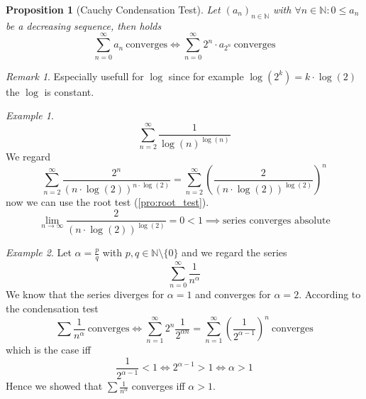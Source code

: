 \documentclass[english,titlepage]{uzhpub}
\theoremstyle{definition}
\theoremstyle{plain}
\newtheorem{proposition}[definition]{Proposition}
\theoremstyle{remark}
\newtheorem*{remark}{Remark}
\theoremstyle{example}
\newtheorem*{example}{Example}
\begin{document}
   \begin{proposition}[Cauchy Condensation Test]\label{pro:cauchy_condens}
      Let \((a_n)_{n \in \mathbb{N}}\) with \(\forall n \in \mathbb{N}: 0 \leq a_n\) be a decreasing sequence, then holds
      \[\sum_{n=0}^\infty a_n~\text{converges} \iff \sum_{n=0}^\infty 2^n \cdot a_{2^n}~\text{converges}\]
   \end{proposition}
   \begin{remark}
      Especially usefull for \(\log\) since for example \(\log(2^k) = k \cdot \log(2)\) the \(\log\) is constant.
   \end{remark}
   \begin{example}
      \[\sum_{n=2}^\infty \frac{1}{\log(n)^{\log(n)}}\]
      We regard
      \[\sum_{n=2}^\infty \frac{2^n}{(n \cdot \log(2))^{n \cdot \log(2)}} = \sum_{n=2}^\infty \left(\frac{2}{(n \cdot \log(2))^{\log(2)}}\right)^n\]
      now we can use the root test (\ref{pro:root_test}).
      \[\lim_{n \to \infty} \frac{2}{(n \cdot \log(2))^{\log(2)}} = 0 < 1 \implies \text{series converges absolute}\]
   \end{example}
   \begin{example}
      Let \(\alpha = \frac{p}{q}\) with \(p, q \in \mathbb{N} \setminus \{0\}\) and we regard the series
      \[\sum_{n=0}^\infty \frac{1}{n^\alpha}\]
      We know that the series diverges for \(\alpha = 1\) and converges for \(\alpha = 2\).
      According to the condensation test
      \[\sum \frac{1}{n^\alpha}~\text{converges} \iff \sum_{n=1}^\infty 2^n \frac{1}{2^{\alpha n}} = \sum_{n=1}^\infty \left(\frac{1}{2^{\alpha - 1}}\right)^n~\text{converges}\]
      which is the case iff
      \[\frac{1}{2^{\alpha -1}} < 1 \iff 2^{\alpha - 1} > 1 \iff \alpha > 1\]
      Hence we showed that \(\sum \frac{1}{n^\alpha}\) converges iff \(\alpha > 1\).
   \end{example}
\end{document}
